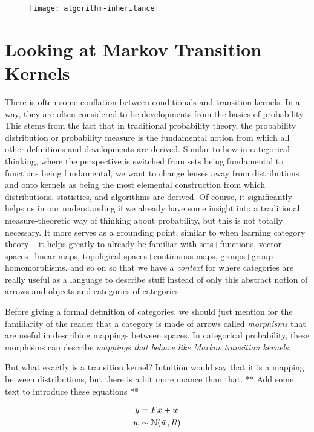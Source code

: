 \begin{figure}[htb]
    \texttt{[image: algorithm-inheritance]}
	\caption{}
    \label{fig:algorithm-inheritance}
\end{figure}

\section{Looking at Markov Transition Kernels}

There is often some conflation between conditionals and transition kernels.
In a way, they are often considered to be developments from the basics of probability.
This stems from the fact that in traditional probability theory, the probability distribution or probability measure is the fundamental notion from which all other definitions and developments are derived.
Similar to how in categorical thinking, where the perspective is switched from sets being fundamental to functions being fundamental, we want to change lenses away from distributions and onto kernels as being the most elemental construction from which distributions, statistics, and algorithms are derived. 
Of course, it significantly helps us in our understanding if we already have some insight into a traditional measure-theoretic way of thinking about probability, but this is not totally necessary.
It more serves as a grounding point, similar to when learning category theory -- it helps greatly to already be familiar with sets+functions, vector spaces+linear maps, topoligical spaces+continuous maps, groups+group homomorphisms, and so on so that we have a \emph{context} for where categories are really useful as a language to describe stuff instead of only this abstract notion of arrows and objects and categories of categories.

Before giving a formal definition of categories, we should just mention for the familiarity of the reader that a category is made of arrows called \emph{morphisms} that are useful in describing mappings between spaces. In categorical probability, these morphisms can describe \emph{mappings that behave like Markov transition kernels}.

But what exactly is a transition kernel?
Intuition would say that it is a mapping between distributions, but there is a bit more nuance than that. ** Add some text to introduce these equations **

\begin{equation}
\label{traditional-gaussian-model}
\begin{gathered}
    y = Fx + w \\
    w \sim \mathcal{N}(\bar{w}, R)
\end{gathered}
\end{equation}

